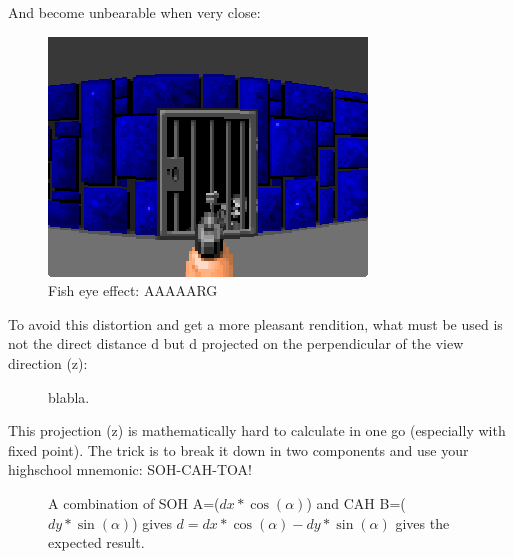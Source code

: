 And become unbearable when very close:
 \begin{figure}[H]
\centering
 \includegraphics[width=\textwidth]{imgs/fish_eye/bad_bad.png}
 \caption{Fish eye effect: AAAAARG} \label{fig:mips}
 \end{figure}
 
To avoid this distortion and get a more pleasant rendition, what must be used is not the direct distance d but d projected on the perpendicular of the view direction (z):

\begin{figure}[H]
\centering
 
 \caption{blabla.} \label{fig:Raycasting2}
\end{figure}

This projection (z) is mathematically hard to calculate in one go (especially with fixed point). The trick is to break it down in two components and use your highschool mnemonic: SOH-CAH-TOA!\\

\begin{figure}[H]
\centering
 
 \caption{A combination of SOH A=($dx * \cos(\alpha)$) and CAH B=($ dy * \sin(\alpha) $) gives $d = dx * \cos(\alpha) - dy * \sin(\alpha) $ gives the expected result.}
\end{figure}

